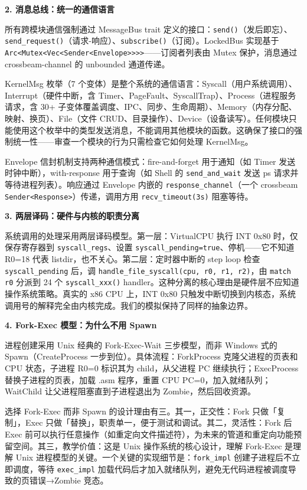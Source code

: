 \documentclass[UTF8,a4paper,12pt]{ctexart}
\begin{document}
\textbf{2. 消息总线：统一的通信语言}

所有跨模块通信强制通过 MessageBus trait 定义的接口：\texttt{send()}（发后即忘）、\texttt{send\_request()}（请求-响应）、\texttt{subscribe()}（订阅）。LockedBus 实现基于 \texttt{Arc<Mutex<Vec<Sender<Envelope>>>>}——订阅者列表由 Mutex 保护，消息通过 crossbeam-channel 的 unbounded 通道传递。

KernelMsg 枚举（7 个变体）是整个系统的通信语言：Syscall（用户系统调用）、Interrupt（硬件中断，含 Timer、PageFault、SyscallTrap）、Process（进程服务请求，含 30+ 子变体覆盖调度、IPC、同步、生命周期）、Memory（内存分配、映射、换页）、File（文件 CRUD、目录操作）、Device（设备读写）。任何模块只能使用这个枚举中的类型发送消息，不能调用其他模块的函数。这确保了接口的强制统一性——审查一个模块的行为只需检查它如何处理 KernelMsg。

Envelope 信封机制支持两种通信模式：fire-and-forget 用于通知（如 Timer 发送时钟中断），with-response 用于查询（如 Shell 的 \texttt{send\_and\_wait} 发送 ps 请求并等待进程列表）。响应通过 Envelope 内嵌的 \texttt{response\_channel}（一个 crossbeam \texttt{Sender<Response>}）传递，调用方用 \texttt{recv\_timeout(3s)} 阻塞等待。

\textbf{3. 两层译码：硬件与内核的职责分离}

系统调用的处理采用两层译码模型。第一层：VirtualCPU 执行 INT 0x80 时，仅保存寄存器到 \texttt{syscall\_regs}、设置 \texttt{syscall\_pending=true}、停机——它不知道 R0=18 代表 listdir，也不关心。第二层：定时器中断的 step loop 检查 \texttt{syscall\_pending} 后，调 \texttt{handle\_file\_syscall(cpu, r0, r1, r2)}，由 \texttt{match r0} 分派到 24 个 \texttt{syscall\_xxx()} handler。这种分离的核心理由是硬件层不应知道操作系统策略。真实的 x86 CPU 上，INT 0x80 只触发中断切换到内核态，系统调用号的解释完全由内核完成。我们的模拟保持了同样的抽象边界。

\textbf{4. Fork-Exec 模型：为什么不用 Spawn}

进程创建采用 Unix 经典的 Fork-Exec-Wait 三步模型，而非 Windows 式的 Spawn（CreateProcess 一步到位）。具体流程：ForkProcess 克隆父进程的页表和 CPU 状态，子进程 R0=0 标识其为 child，从父进程 PC 继续执行；ExecProcess 替换子进程的页表，加载 .asm 程序，重置 CPU PC=0，加入就绪队列；WaitChild 让父进程阻塞直到子进程退出为 Zombie，然后回收资源。

选择 Fork-Exec 而非 Spawn 的设计理由有三。其一，正交性：Fork 只做「复制」，Exec 只做「替换」，职责单一，便于测试和调试。其二，灵活性：Fork 后 Exec 前可以执行任意操作（如重定向文件描述符），为未来的管道和重定向功能预留空间。其三，教学价值：这是 Unix 操作系统的核心设计，理解 Fork-Exec 是理解 Unix 进程模型的关键。一个关键的实现细节是：\texttt{fork\_impl} 创建子进程后不立即调度，等待 \texttt{exec\_impl} 加载代码后才加入就绪队列，避免无代码进程被调度导致的页错误→Zombie 竞态。
\end{document}

